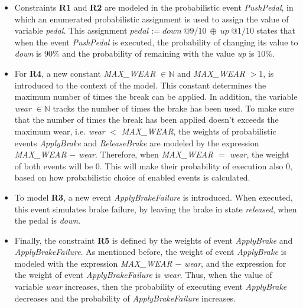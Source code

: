 \begin{itemize}
    \item Constraints \textbf{R1} and \textbf{R2} are modeled in the probabilistic event \textit{PushPedal}, in which an enumerated probabilistic assignment is used to assign the value of variable \textit{pedal}. This assignment $pedal := down \ @9/10  \ \oplus \ up \ @1/10$ states that when the event \textit{PushPedal} is executed, the probability of changing its value to \textit{down} is $90\%$ and the probability of remaining with the value \textit{up} is $10\%$.
    \item For \textbf{R4}, a new constant \textit{MAX\_WEAR} $\in \mathbb{N}$ and \textit{MAX\_WEAR} $> 1$, is introduced to the context of the model. This constant determines the maximum number of times the break can be applied. In addition, the variable \textit{wear} $\in \mathbb{N}$ tracks the number of times the brake has been used. To make sure that the number of times the break has been applied doesn't exceeds the maximum wear, i.e. \textit{wear} $<$ \textit{MAX\_WEAR}, the weights of probabilistic events \textit{ApplyBrake} and \textit{ReleaseBrake} are modeled by the expression \textit{MAX\_WEAR} $-$ \textit{wear}. Therefore, when \textit{MAX\_WEAR} $=$ \textit{wear}, the weight of both events will be 0. This will make their probability of execution also 0, based on how probabilistic choice of enabled events is calculated.
    \item To model \textbf{R3}, a new event \textit{ApplyBrakeFailure} is introduced. When executed, this event simulates brake failure, by leaving the brake in state \textit{released}, when the pedal is \textit{down}.
    \item Finally, the constraint \textbf{R5} is defined by the weights of event \textit{ApplyBrake} and \textit{ApplyBrakeFailure}. As mentioned before, the weight of event \textit{ApplyBrake} is modeled with the expression \textit{MAX\_WEAR} $-$ \textit{wear}, and the expression for the weight of event \textit{ApplyBrakeFailure} is \textit{wear}. Thus, when the value of variable \textit{wear} increases, then the probability of executing event \textit{ApplyBrake} decreases and the probability of \textit{ApplyBrakeFailure} increases. 
    
    \end{itemize}
